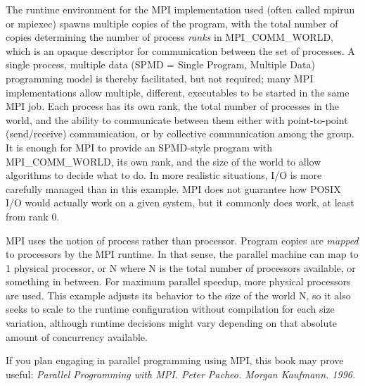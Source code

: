 The runtime environment for the MPI implementation used (often called mpirun or
mpiexec) spawns multiple copies of the program, with the total number of copies
determining the number of process \emph{ranks} in MPI\_COMM\_WORLD, which is
an opaque descriptor for communication between the set of processes. A single
process, multiple data (SPMD = Single Program, Multiple Data) programming model
is thereby facilitated, but not required; many MPI implementations allow
multiple, different, executables to be started in the same MPI job. Each
process has its own rank, the total number of processes in the world, and the
ability to communicate between them either with point-to-point (send/receive)
communication, or by collective communication among the group. It is enough for
MPI to provide an SPMD-style program with MPI\_COMM\_WORLD, its own rank, and
the size of the world to allow algorithms to decide what to do. In more
realistic situations, I/O is more carefully managed than in this example. MPI
does not guarantee how POSIX I/O would actually work on a given system, but it
commonly does work, at least from rank 0.

MPI uses the notion of process rather than processor. Program copies are
\emph{mapped} to processors by the MPI runtime. In that sense, the parallel
machine can map to 1 physical processor, or N where N is the total number of
processors available, or something in between. For maximum parallel speedup,
more physical processors are used. This example adjusts its behavior to the
size of the world N, so it also seeks to scale to the runtime configuration
without compilation for each size variation, although runtime decisions might
vary depending on that absolute amount of concurrency available.

\begin{tip}
If you plan engaging in parallel programming using MPI, this
book may prove useful: \emph{Parallel Programming with MPI. Peter Pacheo.
Morgan Kaufmann. 1996.}
\end{tip}

